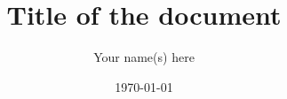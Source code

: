 \documentclass[english,notitlepage]{revtex4-1}  %
\begin{document}
\title{Title of the document}      %
\author{Your name(s) here}          %
\date{\today}                             %
\noaffiliation                            %


\maketitle 
    

   
\end{document}
